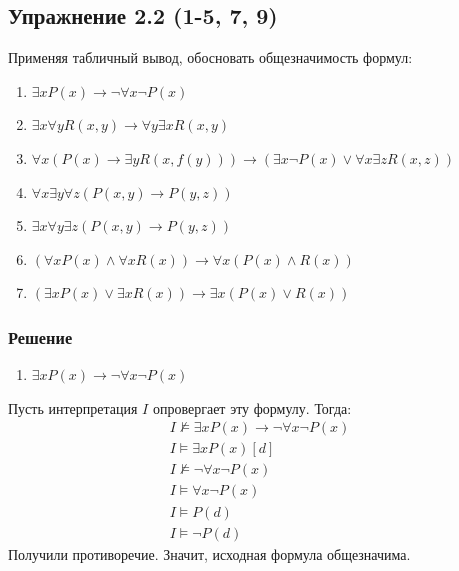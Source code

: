 \documentclass[11pt]{article}
\newcounter{th}\setcounter{th}{0}
\begin{document}
\subsection{Упражнение 2.2 (1-5, 7, 9)}
\label{sec:orgd22f128}
Применяя табличный вывод, обосновать общезначимость формул:
\begin{enumerate}
\item \(\exists x P(x) \to \lnot \forall x \lnot P(x)\)
\item \(\exists x \forall y R(x, y) \to \forall y \exists x R(x, y)\)
\item \(\forall x (P(x) \to \exists y R(x, f(y))) \to (\exists x \lnot P(x) \lor \forall x \exists z R(x, z))\)
\item \(\forall x \exists y \forall z (P(x, y) \to P(y, z))\)
\item \(\exists x \forall y \exists z (P(x, y) \to P(y, z))\)
\item \((\forall x P(x) \land \forall x R(x)) \to \forall x (P(x) \land R(x))\)
\item \((\exists x P(x) \lor \exists x R(x)) \to \exists x (P(x) \lor R(x))\)
\end{enumerate}
\subsubsection{Решение}
\label{sec:org3e5a5ee}
\begin{enumerate}
\item \(\exists x P(x) \to \lnot \forall x \lnot P(x)\)
\end{enumerate}
Пусть интерпретация \(I\) опровергает эту формулу. Тогда:
\begin{gather*}
I \not\models \exists x P(x) \to \lnot\forall x \lnot P(x) \\
I \models \exists x P(x)[d] \\
I \not\models \lnot\forall x \lnot P(x) \\
I \models \forall x \lnot P(x) \\
I \models P(d) \\
I \models \lnot P(d)
\end{gather*}
Получили противоречие. Значит, исходная формула общезначима.
\end{document}
